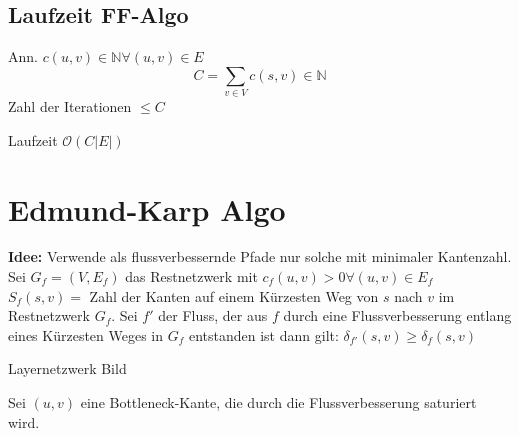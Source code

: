 \documentclass[a4paper,draft,twoside,10pt]{report}
\begin{document}
\subsection{Laufzeit FF-Algo}
Ann. $c(u,v)\in \mathbb N \forall (u,v)\in E$
\[C=\sum_{v\in V} c(s,v)\in \mathbb N \]
Zahl der Iterationen $\leq C$

Laufzeit $\mathcal O(C|E|)$

\section{Edmund-Karp Algo}
\textbf{Idee:} Verwende als flussverbessernde Pfade nur solche mit minimaler Kantenzahl.
Sei $G_f=(V,E_f)$ das Restnetzwerk mit $c_f(u,v)>0 \forall (u,v)\in E_f$
$S_f(s,v) =$ Zahl der Kanten auf einem Kürzesten Weg von $s$ nach $v$ im Restnetzwerk $G_f$.
Sei $f'$ der Fluss, der aus $f$ durch eine Flussverbesserung entlang eines Kürzesten Weges in $G_f$ entstanden ist dann gilt: $\delta _{f'} (s,v) \geq \delta_f(s,v)$

Layernetzwerk Bild

Sei $(u,v)$ eine Bottleneck-Kante, die durch die Flussverbesserung saturiert wird.
\end{document}
